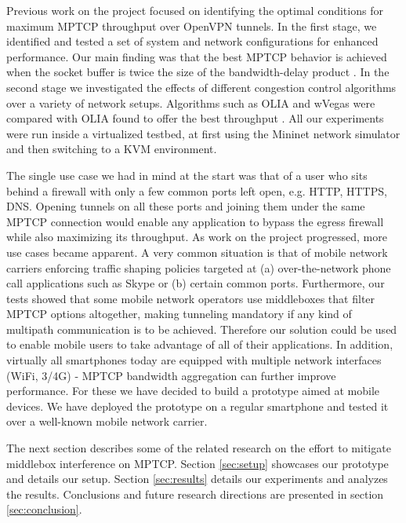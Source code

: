 Previous work on the project focused on identifying the optimal conditions for maximum MPTCP throughput over OpenVPN tunnels. In the first stage, we identified and tested a set of system and network configurations for enhanced performance. Our main finding was that the best MPTCP behavior is achieved when the socket buffer is twice the size of the bandwidth-delay product \cite{sem2}. In the second stage we investigated the effects of different congestion control algorithms over a variety of network setups. Algorithms such as OLIA and wVegas were compared with OLIA found to offer the best throughput \cite{sem3}. All our experiments were run inside a virtualized testbed, at first using the Mininet network simulator and then switching to a KVM environment.

The single use case we had in mind at the start was that of a user who sits behind a firewall with only a few common ports left open, e.g. HTTP, HTTPS, DNS. Opening tunnels on all these ports and joining them under the same MPTCP connection would enable any application to bypass the egress firewall while also maximizing its throughput. As work on the project progressed, more use cases became apparent. A very common situation is that of mobile network carriers enforcing traffic shaping policies targeted at (a) over-the-network phone call applications such as Skype or (b) certain common ports. Furthermore, our tests showed that some mobile network operators use middleboxes that filter MPTCP options altogether, making tunneling mandatory if any kind of multipath communication is to be achieved. Therefore our solution could be used to enable mobile users to take advantage of all of their applications. In addition, virtually all smartphones today are equipped with multiple network interfaces (WiFi, 3/4G) - MPTCP bandwidth aggregation can further improve performance. For these we have decided to build a prototype aimed at mobile devices. We have deployed the prototype on a regular smartphone and tested it over a well-known mobile network carrier.

The next section describes some of the related research on the effort to mitigate middlebox interference on MPTCP. Section \ref{sec:setup} showcases our prototype and details our setup. Section \ref{sec:results} details our experiments and analyzes the results. Conclusions and future research directions are presented in section \ref{sec:conclusion}.